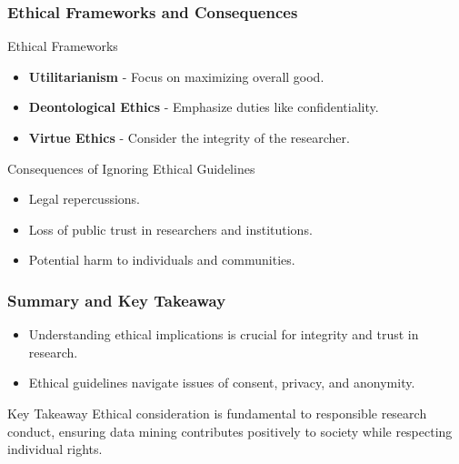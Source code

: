 \documentclass{beamer}
\begin{document}
\begin{frame}[fragile]
    \frametitle{Ethical Frameworks and Consequences}
    \begin{block}{Ethical Frameworks}
        \begin{itemize}
            \item \textbf{Utilitarianism} - Focus on maximizing overall good.
            \item \textbf{Deontological Ethics} - Emphasize duties like confidentiality.
            \item \textbf{Virtue Ethics} - Consider the integrity of the researcher.
        \end{itemize}
    \end{block}

    \begin{block}{Consequences of Ignoring Ethical Guidelines}
        \begin{itemize}
            \item Legal repercussions.
            \item Loss of public trust in researchers and institutions.
            \item Potential harm to individuals and communities.
        \end{itemize}
    \end{block}
\end{frame}

\begin{frame}[fragile]
    \frametitle{Summary and Key Takeaway}
    \begin{itemize}
        \item Understanding ethical implications is crucial for integrity and trust in research.
        \item Ethical guidelines navigate issues of consent, privacy, and anonymity.
    \end{itemize}
    
    \begin{block}{Key Takeaway}
        Ethical consideration is fundamental to responsible research conduct, ensuring data mining contributes positively to society while respecting individual rights.
    \end{block}
\end{frame}
\end{document}
